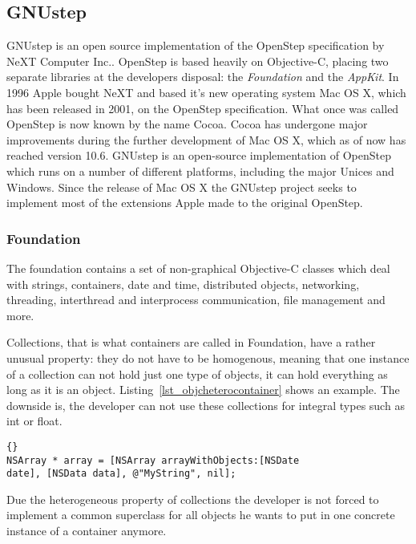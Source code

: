 \subsection{GNUstep}
GNUstep is an open source implementation of the OpenStep
specification\cite{misc:OpenStepSpec} by NeXT Computer Inc.\cite{misc:NeXT}.
OpenStep is based heavily on Objective-C, placing two separate libraries at
the developers disposal: the \textit{Foundation} and the \textit{AppKit}. In
1996 Apple bought NeXT and based it's new operating system Mac OS X, which has
been released in 2001, on the OpenStep specification. What once was called
OpenStep is now known by the name Cocoa. Cocoa has undergone major improvements
during the further development of Mac OS X, which as of now has reached version
10.6. GNUstep is an open-source implementation of OpenStep which runs on a
number of different platforms, including the major Unices and Windows. Since
the release of Mac OS X the GNUstep project seeks to implement most of the
extensions Apple made to the original OpenStep.

\subsubsection{Foundation}

The foundation contains a set of non-graphical Objective-C classes which deal
with strings, containers, date and time, distributed objects, networking,
threading,  interthread and interprocess communication, file management and
more.

Collections, that is what containers are called in Foundation, have a rather
unusual property: they do not have to be homogenous, meaning that one instance
of a collection can not hold just one type of objects, it can hold everything
as long as it is an object. Listing~\ref{lst_objcheterocontainer} shows an
example. The downside is, the developer can not use these collections for
integral types such as int or float.

\begin{lstlisting}[captionpos=b, caption=Argument with class type information.,
label=lst_objcheterocontainer]{}
NSArray * array = [NSArray arrayWithObjects:[NSDate
date], [NSData data], @"MyString", nil];
\end{lstlisting}

Due the heterogeneous property of collections the developer is not forced to
implement a common superclass for all objects he wants to put in one concrete
instance of a container anymore.

